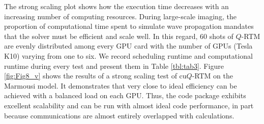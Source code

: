 The strong scaling plot shows how the execution time decreases with an increasing number of computing resources. During large-scale imaging, the proportion of computational time  spent to simulate wave propagation mandates that the solver must be efficient and scale well. In this regard, 60 shots of $Q$-RTM are evenly distributed among every GPU card with the number of GPUs (Tesla K10) varying from one to six. We record scheduling runtime and computational runtime during every test and present them in Table \ref{tbl:tab3}. Figure \ref{fig:Fig8_v} shows the results of a strong scaling test of cu$Q$-RTM on the Marmousi model. It demonstrates that very close to ideal efficiency can be achieved with a balanced load on each GPU. Thus, the code package exhibits excellent scalability and can be run with almost ideal code performance, in part because communications are almost entirely overlapped with calculations. 








